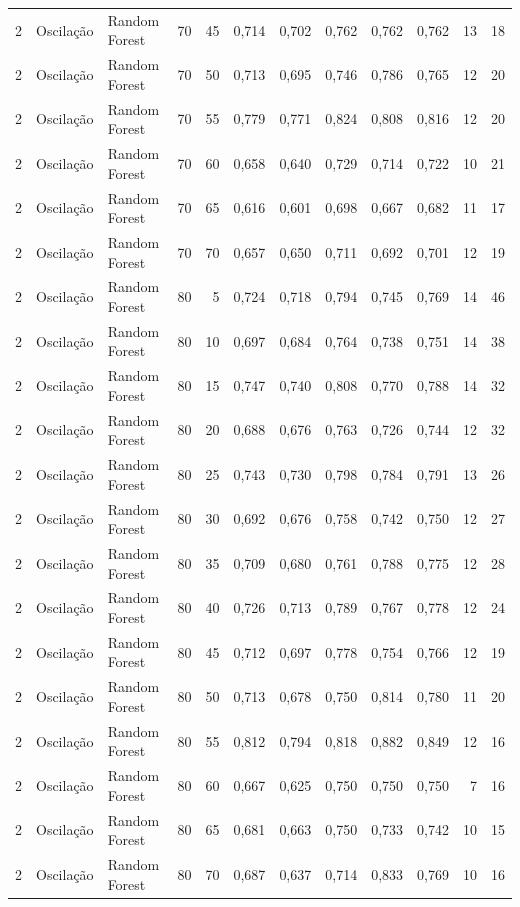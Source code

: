 \begin{longtable}{@{}rllrrrrrrrrr@{}}
2 & Oscilação & Random Forest & 70 & 45 & 0,714 & 0,702 & 0,762 & 0,762 & 0,762 & 13 & 18 \\
2 & Oscilação & Random Forest & 70 & 50 & 0,713 & 0,695 & 0,746 & 0,786 & 0,765 & 12 & 20 \\
2 & Oscilação & Random Forest & 70 & 55 & 0,779 & 0,771 & 0,824 & 0,808 & 0,816 & 12 & 20 \\
2 & Oscilação & Random Forest & 70 & 60 & 0,658 & 0,640 & 0,729 & 0,714 & 0,722 & 10 & 21 \\
2 & Oscilação & Random Forest & 70 & 65 & 0,616 & 0,601 & 0,698 & 0,667 & 0,682 & 11 & 17 \\
2 & Oscilação & Random Forest & 70 & 70 & 0,657 & 0,650 & 0,711 & 0,692 & 0,701 & 12 & 19 \\
2 & Oscilação & Random Forest & 80 & 5 & 0,724 & 0,718 & 0,794 & 0,745 & 0,769 & 14 & 46 \\
2 & Oscilação & Random Forest & 80 & 10 & 0,697 & 0,684 & 0,764 & 0,738 & 0,751 & 14 & 38 \\
2 & Oscilação & Random Forest & 80 & 15 & 0,747 & 0,740 & 0,808 & 0,770 & 0,788 & 14 & 32 \\
2 & Oscilação & Random Forest & 80 & 20 & 0,688 & 0,676 & 0,763 & 0,726 & 0,744 & 12 & 32 \\
2 & Oscilação & Random Forest & 80 & 25 & 0,743 & 0,730 & 0,798 & 0,784 & 0,791 & 13 & 26 \\
2 & Oscilação & Random Forest & 80 & 30 & 0,692 & 0,676 & 0,758 & 0,742 & 0,750 & 12 & 27 \\
2 & Oscilação & Random Forest & 80 & 35 & 0,709 & 0,680 & 0,761 & 0,788 & 0,775 & 12 & 28 \\
2 & Oscilação & Random Forest & 80 & 40 & 0,726 & 0,713 & 0,789 & 0,767 & 0,778 & 12 & 24 \\
2 & Oscilação & Random Forest & 80 & 45 & 0,712 & 0,697 & 0,778 & 0,754 & 0,766 & 12 & 19 \\
2 & Oscilação & Random Forest & 80 & 50 & 0,713 & 0,678 & 0,750 & 0,814 & 0,780 & 11 & 20 \\
2 & Oscilação & Random Forest & 80 & 55 & 0,812 & 0,794 & 0,818 & 0,882 & 0,849 & 12 & 16 \\
2 & Oscilação & Random Forest & 80 & 60 & 0,667 & 0,625 & 0,750 & 0,750 & 0,750 & 7 & 16 \\
2 & Oscilação & Random Forest & 80 & 65 & 0,681 & 0,663 & 0,750 & 0,733 & 0,742 & 10 & 15 \\
2 & Oscilação & Random Forest & 80 & 70 & 0,687 & 0,637 & 0,714 & 0,833 & 0,769 & 10 & 16 \\

\end{longtable}

